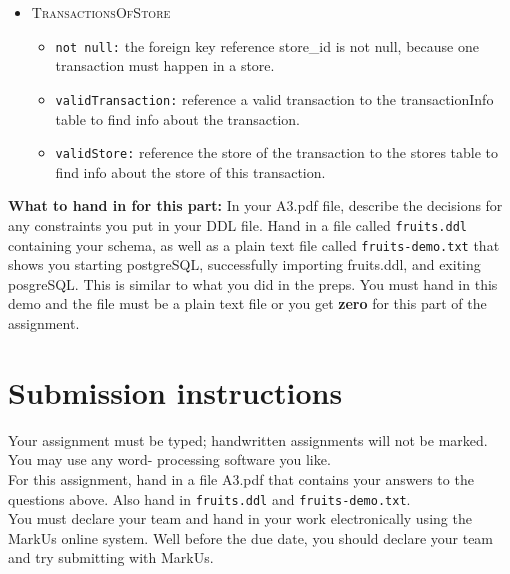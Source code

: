 \documentclass[10pt]{article}
\begin{document}
\begin{enumerate}
\begin{enumerate}
\begin{mdframed}[leftmargin=-6.5mm]
\begin{itemize}
            \item \textsc{TransactionsOfStore}
            \begin{itemize}
                \item \texttt{not null:} the foreign key reference store\_id is not null, because one transaction must happen in a store.
                \item \texttt{validTransaction:} reference a valid transaction to the transactionInfo table to find info about the transaction.
                \item \texttt{validStore:} reference the store of the transaction to the stores table to find info about the store of this transaction.
            \end{itemize}
            
        \end{itemize}
        \end{mdframed}
        
    \end{enumerate}
    
    \textbf{What to hand in for this part:}
    In your A3.pdf file, describe the decisions for any constraints you put in your DDL file. Hand in a file called \texttt{fruits.ddl} containing your schema, as well as a plain text file called \texttt{fruits-demo.txt} that shows you starting postgreSQL, successfully importing fruits.ddl, and exiting posgreSQL. This is similar to what you did in the preps. You must hand in this demo and the file must be a plain text file or you get \textbf{zero} for this part of the assignment.
\end{enumerate}

\newpage
\section*{Submission instructions}
Your assignment must be typed; handwritten assignments will not be marked. You may use any word- processing software you like.\\
For this assignment, hand in a file A3.pdf that contains your answers to the questions above. Also hand in \texttt{fruits.ddl} and \texttt{fruits-demo.txt}.\\
You must declare your team and hand in your work electronically using the MarkUs online system. Well before the due date, you should declare your team and try submitting with MarkUs.
\end{document}
